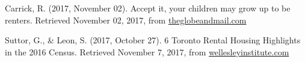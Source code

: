 \begin{thebibliography}{9}
  Carrick, R. (2017, November 02). Accept it, your children may grow up to be renters. Retrieved November 02, 2017, from \href{https://beta.theglobeandmail.com/globe-investor/personal-finance/household-finances/accept-it-your-children-may-grow-up-to-be-renters/article36806999/}{theglobeandmail.com}

  Suttor, G., \& Leon, S. (2017, October 27). 6 Toronto Rental Housing Highlights in the 2016 Census. Retrieved November 7, 2017, from \href{http://www.wellesleyinstitute.com/housing/6-toronto-rental-housing-highlights-in-the-2016-census}{wellesleyinstitute.com}


\end{thebibliography}

